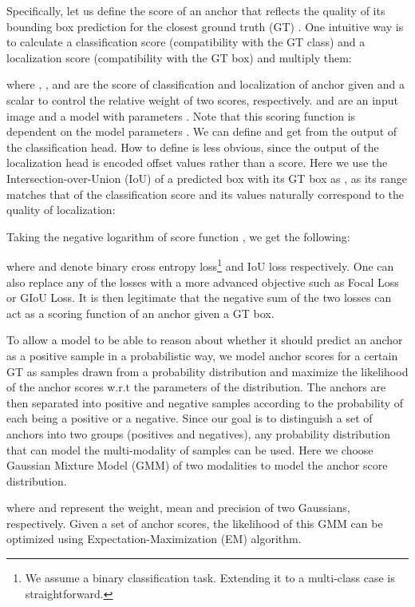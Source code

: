 \documentclass[runningheads]{llncs}
\begin{document}
Specifically, let us define the score of an anchor that reflects the quality of its bounding box prediction for the closest ground truth (GT) . One intuitive way is to calculate a classification score (compatibility with the GT class) and a localization score (compatibility with the GT box) and multiply them: 

where , , and  are the score of classification and localization of anchor  given  and a scalar to control the relative weight of two scores, respectively.  and  are an input image and a model with parameters . Note that this scoring function is dependent on the model parameters . We can define and get  from the output of the classification head. How to define  is less obvious, since the output of the localization head is encoded offset values rather than a score. Here we use the Intersection-over-Union (IoU) of a predicted box with its GT box as , as its range matches that of the classification score and its values naturally correspond to the quality of localization:


Taking the negative logarithm of score function , we get the following:

where  and  denote binary cross entropy loss\footnote{We assume a binary classification task. Extending it to a multi-class case is straightforward.} and IoU loss\cite{iouloss} respectively. One can also replace any of the losses with a more advanced objective such as Focal Loss\cite{focal} or GIoU Loss\cite{giou}. It is then legitimate that the negative sum of the two losses can act as a scoring function of an anchor given a GT box.

To allow a model to be able to reason about whether it should predict an anchor as a positive sample in a probabilistic way, we model anchor scores for a certain GT as samples drawn from a probability distribution and maximize the likelihood of the anchor scores w.r.t the parameters of the distribution. The anchors are then separated into positive and negative samples according to the probability of each being a positive or a negative. Since our goal is to distinguish a set of anchors into two groups (positives and negatives), any probability distribution that can model the multi-modality of samples can be used. Here we choose Gaussian Mixture Model (GMM) of two modalities to model the anchor score distribution. 

where  and  represent the weight, mean and precision of two Gaussians, respectively. Given a set of anchor scores, the likelihood of this GMM can be optimized using Expectation-Maximization (EM) algorithm.
\end{document}
